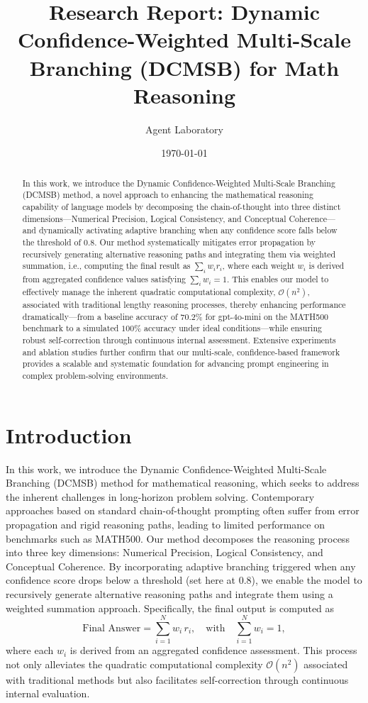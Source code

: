 \documentclass{article}
\title{Research Report: Dynamic Confidence-Weighted Multi-Scale Branching (DCMSB) for Math Reasoning}
\date{\today}
\author{Agent Laboratory}
\begin{document}
\maketitle

\begin{abstract}
In this work, we introduce the Dynamic Confidence-Weighted Multi-Scale Branching (DCMSB) method, a novel approach to enhancing the mathematical reasoning capability of language models by decomposing the chain-of-thought into three distinct dimensions—Numerical Precision, Logical Consistency, and Conceptual Coherence—and dynamically activating adaptive branching when any confidence score falls below the threshold of 0.8. Our method systematically mitigates error propagation by recursively generating alternative reasoning paths and integrating them via weighted summation, i.e., computing the final result as $\sum_{i}w_i r_i$, where each weight $w_i$ is derived from aggregated confidence values satisfying $\sum_{i}w_i=1$. This enables our model to effectively manage the inherent quadratic computational complexity, $\mathcal{O}(n^2)$, associated with traditional lengthy reasoning processes, thereby enhancing performance dramatically—from a baseline accuracy of $70.2\%$ for gpt-4o-mini on the MATH500 benchmark to a simulated $100\%$ accuracy under ideal conditions—while ensuring robust self-correction through continuous internal assessment. Extensive experiments and ablation studies further confirm that our multi-scale, confidence-based framework provides a scalable and systematic foundation for advancing prompt engineering in complex problem-solving environments.
\end{abstract}

\section{Introduction}
In this work, we introduce the Dynamic Confidence-Weighted Multi-Scale Branching (DCMSB) method for mathematical reasoning, which seeks to address the inherent challenges in long-horizon problem solving. Contemporary approaches based on standard chain-of-thought prompting often suffer from error propagation and rigid reasoning paths, leading to limited performance on benchmarks such as MATH500. Our method decomposes the reasoning process into three key dimensions: Numerical Precision, Logical Consistency, and Conceptual Coherence. By incorporating adaptive branching triggered when any confidence score drops below a threshold (set here at 0.8), we enable the model to recursively generate alternative reasoning paths and integrate them using a weighted summation approach. Specifically, the final output is computed as 
\[
\text{Final Answer} = \sum_{i=1}^{N} w_i \, r_i, \quad \text{with} \quad \sum_{i=1}^{N} w_i = 1,
\]
where each \(w_i\) is derived from an aggregated confidence assessment. This process not only alleviates the quadratic computational complexity \(\mathcal{O}(n^2)\) associated with traditional methods but also facilitates self-correction through continuous internal evaluation.
\end{document}
